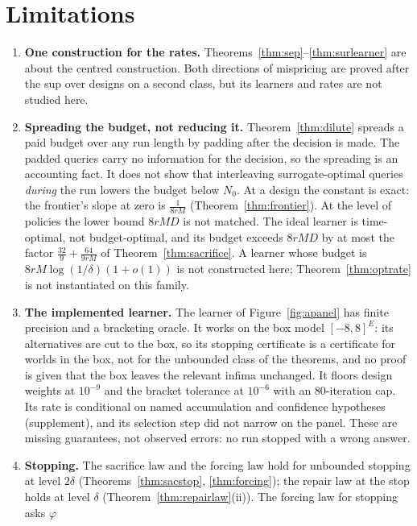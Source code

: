 \section{Limitations}
\label{sec:limits}

\begin{enumerate}
\item[1)] \textbf{One construction for the rates.} Theorems~\ref{thm:sep}--\ref{thm:surlearner}
are about the centred construction. Both directions of mispricing are proved after the sup over
designs on a second class, but its learners and rates are not studied here.
\item[2)] \textbf{Spreading the budget, not reducing it.} Theorem~\ref{thm:dilute} spreads a
paid budget over any run length by padding after the decision is made. The padded queries carry
no information for the decision, so the spreading is an accounting fact. It does not show that
interleaving surrogate-optimal queries \emph{during} the run lowers the budget below $N_{0}$.
At a design the constant is exact: the frontier's slope at zero is $\frac{1}{8rM}$
(Theorem~\ref{thm:frontier}). At the level of policies the lower bound $8rMD$ is not matched.
The ideal learner is time-optimal, not budget-optimal, and its budget exceeds $8rMD$ by at most
the factor $\frac{32}{9}+\frac{64}{9rM}$ of Theorem~\ref{thm:sacrifice}. A learner whose budget is
$8rM\log(1/\delta)(1+o(1))$ is not constructed here; Theorem~\ref{thm:optrate} is not
instantiated on this family.
\item[3)] \textbf{The implemented learner.} The learner of Figure~\ref{fig:apanel} has finite
precision and a bracketing oracle. It works on the box model $[-8,8]^E$: its alternatives are
cut to the box, so its stopping certificate is a certificate for worlds in the box, not for the
unbounded class of the theorems, and no proof is given that the box leaves the relevant infima
unchanged. It floors design weights at $10^{-9}$ and the bracket tolerance at $10^{-6}$ with an
80-iteration cap. Its rate is conditional on named accumulation and confidence hypotheses
(supplement), and its selection step did not narrow on the panel. These are missing guarantees,
not observed errors: no run stopped with a wrong answer.
\item[4)] \textbf{Stopping.} The sacrifice law and the forcing law hold for unbounded stopping at
level $2\delta$ (Theorems~\ref{thm:sacstop}, \ref{thm:forcing}); the repair law at the stop holds
at level $\delta$ (Theorem~\ref{thm:repairlaw}(ii)). The forcing law for stopping asks $\varphi$

\end{enumerate}
